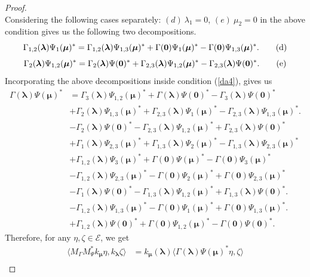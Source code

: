 \documentclass[10pt,a4paper]{amsart}
\newcommand{\cle}{\mathcal{E}}
\begin{document}
\begin{proof}
\[\]
Considering the following cases separately: $(d)~\lambda_1 =0 $, $(e)~\mu_2 = 0$ in the above condition gives us the following two decompositions.
\[
\Gamma_{1,2}(\bm{\lambda}) \Psi_{1}(\bm{\mu})^* =  \Gamma_{1,2}(\bm{\lambda})\Psi_{1,3}(\bm{\mu})^* + \Gamma (\bm{0}) \Psi_{1}(\bm{\mu})^* - \Gamma (\bm{0}) \Psi_{1,3}(\bm{\mu})^*. \tag{\text{d}}
\]
\[
\Gamma_2(\bm{\lambda}) \Psi_{1,2}(\bm{\mu})^* =  \Gamma_2(\bm{\lambda}) \Psi(\bm{0})^*+ \Gamma_{2,3}(\bm{\lambda}) \Psi_{1,2}(\bm{\mu})^* - \Gamma_{2,3}(\bm{\lambda}) \Psi(\bm{0})^*.  \tag{\text{e}}
\]
Incorporating the above decompositions inside condition (\ref{da4}), gives us
\begin{equation}\label{da5}
\begin{split}
\Gamma(\bm{\lambda})  \Psi(\bm{\mu})^* &=  \Gamma_3(\bm{\lambda}) \Psi_{1,2}(\bm{\mu})^* + \Gamma(\bm{\lambda}) \Psi(\bm{0})^* - \Gamma_3(\bm{\lambda}) \Psi(\bm{0})^* \\
&+ \Gamma_2(\bm{\lambda})\Psi_{1,3}(\bm{\mu})^* + \Gamma_{2,3}(\bm{\lambda}) \Psi_{1}(\bm{\mu})^* - \Gamma_{2,3}(\bm{\lambda}) \Psi_{1,3}(\bm{\mu})^*. \\
&- \Gamma_2(\bm{\lambda}) \Psi(\bm{0})^*- \Gamma_{2,3}(\bm{\lambda}) \Psi_{1,2}(\bm{\mu})^* + \Gamma_{2,3}(\bm{\lambda}) \Psi(\bm{0})^*\\
&+ \Gamma_1(\bm{\lambda})  \Psi_{2,3}(\bm{\mu})^* +  \Gamma_{1,3}(\bm{\lambda}) \Psi_{2}(\bm{\mu})^* - \Gamma_{1,3}(\bm{\lambda}) \Psi_{2,3}(\bm{\mu})^* \\
&+ \Gamma_{1,2}(\bm{\lambda})\Psi_{3}(\bm{\mu})^* + \Gamma(\bm{0})\Psi(\bm{\mu})^* - \Gamma(\bm{0})  \Psi_{3}(\bm{\mu})^*\\
\
&- \Gamma_{1,2}(\bm{\lambda}) \Psi_{2,3}(\bm{\mu})^* - \Gamma(\bm{0}) \Psi_{2}(\bm{\mu})^* + \Gamma(\bm{0}) \Psi_{2,3}(\bm{\mu})^* \\
&- \Gamma_1(\bm{\lambda}) \Psi(\bm{0})^* - \Gamma_{1,3}(\bm{\lambda}) \Psi_{1,2}(\bm{\mu})^* + \Gamma_{1,3}(\bm{\lambda}) \Psi(\bm{0})^*.\\
&- \Gamma_{1,2}(\bm{\lambda})\Psi_{1,3}(\bm{\mu})^* - \Gamma (\bm{0}) \Psi_{1}(\bm{\mu})^* + \Gamma (\bm{0}) \Psi_{1,3}(\bm{\mu})^*. \\
&+ \Gamma_{1,2}(\bm{\lambda}) \Psi(\bm{0})^* + \Gamma(\bm{0}) \Psi_{1,2}(\bm{\mu})^* - \Gamma(\bm{0}) \Psi(\bm{0})^*.
\end{split}
\end{equation}
Therefore, for any $\eta, \zeta \in \cle$, we get
\begin{align*}
\langle M_{\Gamma}M_{\Psi}^* k_{\bm{\mu}} \eta, k_{\bm{\lambda}} \zeta \rangle &= k_{\bm{{\mu}}}(\bm{\lambda}) \langle  \Gamma(\bm{\lambda})\Psi(\bm{\mu})^*  \eta,  \zeta \rangle \\

\end{align*}
\end{proof}
\end{document}
